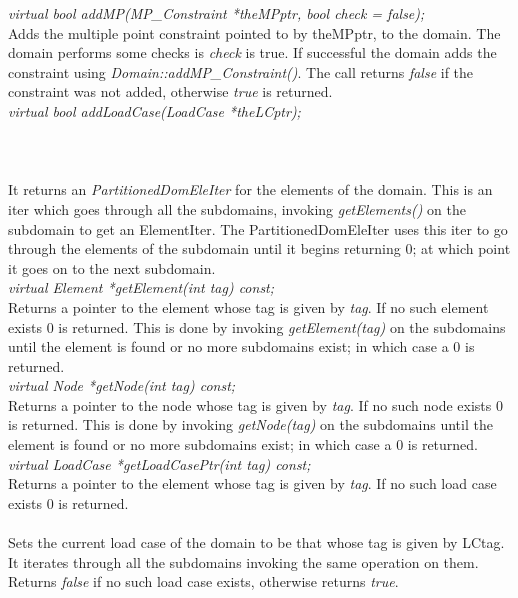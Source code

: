 {\em virtual bool addMP(MP\_Constraint *theMPptr, bool check = false);}  \\
Adds the multiple point constraint pointed to by theMPptr, to the
domain. The domain performs some checks is {\em check} is true. If
successful the domain adds the constraint using {\em
Domain::addMP\_Constraint()}. The call returns {\em false} if
the constraint was not added, otherwise {\em true} is returned. \\  


{\em virtual bool addLoadCase(LoadCase *theLCptr);}  \\
\\

  \\
 \\
It returns an {\em PartitionedDomEleIter} for the elements of the domain. This
is an iter which goes through all the subdomains, invoking {\em
getElements()} on the subdomain to get an ElementIter. The
PartitionedDomEleIter uses this iter to go through the elements of the
subdomain until it begins returning $0$; at which point it goes on to
the next subdomain. \\

{\em virtual  Element *getElement(int tag) const;}\\
Returns a pointer to the element whose tag is given by {\em tag}. If
no such element exists $0$ is returned. This is done by invoking {\em
getElement(tag)} on the subdomains until the element is found or no
more subdomains exist; in which case a $0$ is returned. \\

{\em virtual  Node *getNode(int tag) const;}\\
Returns a pointer to the node whose tag is given by {\em tag}. If
no such node exists $0$ is returned. This is done by invoking {\em
getNode(tag)} on the subdomains until the element is found or no
more subdomains exist; in which case a $0$ is returned. \\

{\em virtual  LoadCase *getLoadCasePtr(int tag) const;}\\
Returns a pointer to the element whose tag is given by {\em tag}. If
no such load case exists $0$ is returned. \\

 \\
Sets the current load case of the domain to be that whose tag is given
by LCtag. It iterates through all the subdomains invoking the same
operation on them. Returns {\em false} if no such load case exists, otherwise
returns {\em true}. \\

